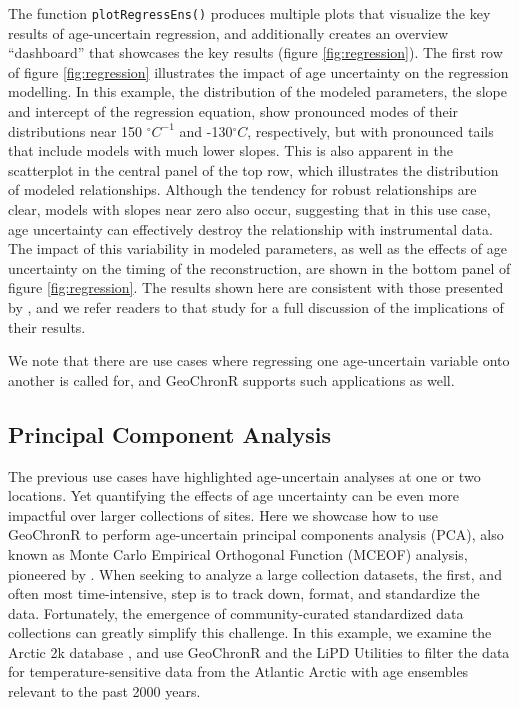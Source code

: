 \documentclass[gchron, manuscript]{copernicus}
\begin{document}
The function \texttt{plotRegressEns()} produces multiple plots that visualize the key results of age-uncertain regression, and additionally creates an overview ``dashboard'' that showcases the key results (figure \ref{fig:regression}).
The first row of figure \ref{fig:regression} illustrates the impact of age uncertainty on the regression modelling.
In this example, the distribution of the modeled parameters, the slope and intercept of the regression equation, show pronounced modes of their distributions near 150 \(^\circ C^{-1}\) and -130\(^\circ C\), respectively, but with pronounced tails that include models with much lower slopes.
This is also apparent in the scatterplot in the central panel of the top row, which illustrates the distribution of modeled relationships.
Although the tendency for robust relationships are clear, models with slopes near zero also occur, suggesting that in this use case, age uncertainty can effectively destroy the relationship with instrumental data.
The impact of this variability in modeled parameters, as well as the effects of age uncertainty on the timing of the reconstruction, are shown in the bottom panel of figure \ref{fig:regression}.
The results shown here are consistent with those presented by \citet{Boldt2015}, and we refer readers to that study for a full discussion of the implications of their results.

We note that there are use cases where regressing one age-uncertain variable onto another is called for, and GeoChronR supports such applications as well.

\hypertarget{sec:pca}{%
\subsection{Principal Component Analysis}\label{sec:pca}}

The previous use cases have highlighted age-uncertain analyses at one or two locations. Yet quantifying the effects of age uncertainty can be even more impactful over larger collections of sites.
Here we showcase how to use GeoChronR to perform age-uncertain principal components analysis (PCA), also known as Monte Carlo Empirical Orthogonal Function (MCEOF) analysis, pioneered by \citet{anchukaitis2013mceof}.
When seeking to analyze a large collection datasets, the first, and often most time-intensive, step is to track down, format, and standardize the data.
Fortunately, the emergence of community-curated standardized data collections \citetext{\citealp[e.g.][]{PAGES2K_ngeo2013_short}; \citealp{pages2k2017}; \citealp[ ]{kaufman2020temp12k}; \citealp{konecky2020iso2k}} can greatly simplify this challenge.
In this example, we examine the Arctic 2k database \citep{McKayKaufman2014}, and use GeoChronR and the LiPD Utilities to filter the data for temperature-sensitive data from the Atlantic Arctic with age ensembles relevant to the past 2000 years.
\end{document}
